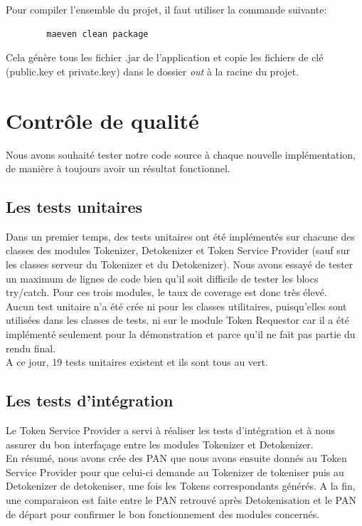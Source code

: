 \documentclass{report}
\begin{document}
\noindent 
Pour compiler l'ensemble du projet, il faut utiliser la commande suivante:

\begin{center}
	\begin{lstlisting}
		maeven clean package
	\end{lstlisting}
\end{center}

\noindent
Cela génère tous les fichier .jar de l'application et copie les fichiers de clé (public.key et private.key) dans le dossier \textit{out} à la racine du projet.


\section{Contrôle de qualité}
Nous avons souhaité tester notre code source à chaque nouvelle implémentation, de manière à toujours avoir un résultat fonctionnel.  

\subsection{Les tests unitaires}
Dans un premier temps, des tests unitaires ont été implémentés sur chacune des classes des modules Tokenizer, Detokenizer et Token Service Provider (sauf sur les classes serveur du Tokenizer et du Detokenizer). Nous avons essayé de tester un maximum de lignes de code bien qu'il soit difficile de tester les blocs try/catch. Pour ces trois modules, le taux de coverage est donc très élevé.\\
Aucun test unitaire n'a été crée ni pour les classes utilitaires, puisqu'elles sont utilisées dans les classes de tests, ni sur le module Token Requestor car il a été implémenté seulement pour la démonstration et parce qu'il ne fait pas partie du rendu final.\\
A ce jour, 19 tests unitaires existent et ils sont tous au vert.

\subsection{Les tests d'intégration}
Le Token Service Provider a servi à réaliser les tests d'intégration et à nous assurer du bon interfaçage entre les modules Tokenizer et Detokenizer.\\
En résumé, nous avons crée des PAN que nous avons ensuite donnés au Token Service Provider pour que celui-ci demande au Tokenizer de tokeniser puis au Detokenizer de detokeniser, une fois les Tokens correspondants générés. A la fin, une comparaison est faite entre le PAN retrouvé après Detokenisation et le PAN de départ pour confirmer le bon fonctionnement des modules concernés. 
\end{document}
